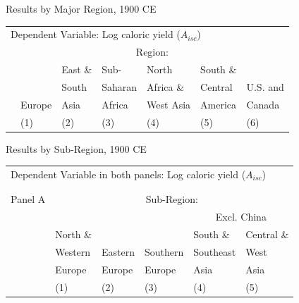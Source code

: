 \documentclass[10pt, xcolor=dvipsnames]{beamer}
\begin{document}
\begin{frame}{Results by Major Region, 1900 CE}\label{reg1900}

{\scriptsize
\begin{tabularx}{\textwidth}{lXXXXXX}
\midrule
\multicolumn{7}{l}{Dependent Variable: Log caloric yield ($A_{isc}$)} \\
 & \multicolumn{6}{c}{Region:} \\ \cmidrule{2-7}
 &        & East \& & Sub-        & North     & South \&  &  \\
 &        & South   & Saharan     & Africa \& & Central   & U.S. and \\
 & Europe & Asia    & Africa      & West Asia & America   & Canada \\
 & (1) & (2) & (3) & (4) & (5) & (6) \\
\midrule

\midrule
\end{tabularx}
}

\hfill \hyperlink{robustness}{}
\end{frame}

\begin{frame}{Results by Sub-Region, 1900 CE}

{\scriptsize
\begin{tabularx}{\textwidth}{lXXXXX}
\midrule
\multicolumn{6}{l}{Dependent Variable in both panels: Log caloric yield ($A_{isc}$)} \\ \\
\\
Panel A & \multicolumn{5}{c}{Sub-Region:} \\ \cmidrule{2-6}
 &          &         &             &  \multicolumn{2}{c}{Excl. China} \\ \cmidrule(lr){5-6}
 & North \& &         &              & South \&  & Central \&             \\
 & Western  & Eastern & Southern     & Southeast & West        \\
 & Europe   & Europe  & Europe       & Asia      & Asia      \\
 & (1) & (2) & (3) & (4) & (5) \\
\midrule

\midrule
\end{tabularx}
}

\hfill \hyperlink{robustness}{}
\end{frame}
\end{document}
